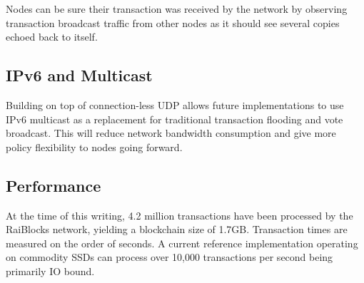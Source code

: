 Nodes can be sure their transaction was received by the network by observing transaction broadcast traffic from other nodes as it should see several copies echoed back to itself.

\subsection{IPv6 and Multicast}
Building on top of connection-less UDP allows future implementations to use IPv6 multicast as a replacement for traditional transaction flooding and vote broadcast. This will reduce network bandwidth consumption and give more policy flexibility to nodes going forward.

\subsection{Performance}
At the time of this writing, 4.2 million transactions have been processed by the RaiBlocks network, yielding a blockchain size of 1.7GB. Transaction times are measured on the order of seconds. A current reference implementation operating on commodity SSDs can process over 10,000 transactions per second being primarily IO bound.